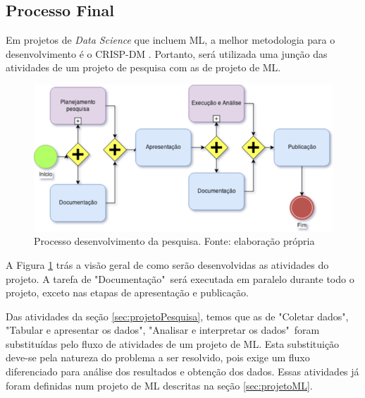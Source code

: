 \subsection{Processo Final}

Em projetos de \textit{Data Science} que incluem ML, a melhor metodologia para o desenvolvimento é o CRISP-DM \cite{CROWSTON2017}.
Portanto, será utilizada uma junção das atividades de um projeto de pesquisa com as de projeto de ML.

\begin{figure}[h]
	\centering
    \includegraphics[keepaspectratio=true,scale=0.5]{figuras/processoPrincipal}
	\caption[Processo desenvolvimento da pesquisa]{Processo desenvolvimento da pesquisa. Fonte: elaboração própria}
	\label{fig:processoPrincipal}
\end{figure}

A Figura \ref{fig:processoPrincipal} trás a visão geral de como serão desenvolvidas as atividades do projeto. A tarefa de "Documentação"\ será executada em paralelo durante todo o projeto, exceto nas etapas de apresentação e publicação.

Das atividades da seção \ref{sec:projetoPesquisa}, temos que as de "Coletar dados", "Tabular e apresentar os dados", "Analisar e interpretar os dados"\ foram substituídas pelo fluxo de atividades de um projeto de ML. Esta substituição deve-se pela natureza do problema a ser resolvido, pois exige um fluxo diferenciado para análise dos resultados e obtenção dos dados. Essas atividades já foram definidas num projeto de ML descritas na seção \ref{sec:projetoML}.

